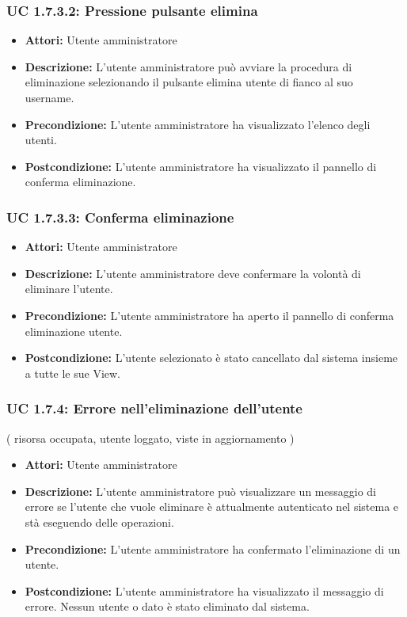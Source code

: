 \subsubsection{UC 1.7.3.2: Pressione pulsante elimina}

\begin{itemize}
    \item \textbf{Attori:} Utente amministratore
    \item \textbf{Descrizione:} L'utente amministratore può avviare la procedura di eliminazione selezionando il pulsante elimina utente di fianco al suo username.
    \item \textbf{Precondizione:} L'utente amministratore ha visualizzato l'elenco degli utenti.
    \item \textbf{Postcondizione:} L'utente amministratore ha visualizzato il pannello di conferma eliminazione.
\end{itemize}

\subsubsection{UC 1.7.3.3: Conferma eliminazione}

\begin{itemize}
    \item \textbf{Attori:} Utente amministratore
    \item \textbf{Descrizione:} L'utente amministratore deve confermare la volontà di eliminare l'utente.
    \item \textbf{Precondizione:} L'utente amministratore ha aperto il pannello di conferma eliminazione utente.
    \item \textbf{Postcondizione:} L'utente selezionato è stato cancellato dal sistema insieme a tutte le sue View.
\end{itemize}

\subsubsection{UC 1.7.4: Errore nell’eliminazione dell'utente}
( risorsa occupata, utente loggato, viste in aggiornamento )

\begin{itemize}
    \item \textbf{Attori:} Utente amministratore
    \item \textbf{Descrizione:} L'utente amministratore può visualizzare un messaggio di errore se l'utente che vuole eliminare è attualmente autenticato nel sistema e stà eseguendo delle operazioni.
    \item \textbf{Precondizione:} L'utente amministratore ha confermato l'eliminazione di un utente.
    \item \textbf{Postcondizione:} L'utente amministratore ha visualizzato il messaggio di errore. Nessun utente o dato è stato eliminato dal sistema.
\end{itemize}

